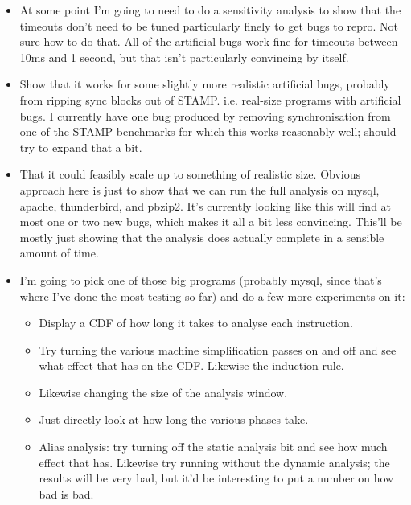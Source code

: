 \begin{itemize}
\item At some point I'm going to need to do a sensitivity analysis to
  show that the timeouts don't need to be tuned particularly finely to
  get bugs to repro.  Not sure how to do that.  All of the artificial
  bugs work fine for timeouts between 10ms and 1 second, but that
  isn't particularly convincing by itself.
\item Show that it works for some slightly more realistic artificial
  bugs, probably from ripping sync blocks out of STAMP.
  i.e. real-size programs with artificial bugs.  I currently have one
  bug produced by removing synchronisation from one of the STAMP
  benchmarks for which this works reasonably well; should try to
  expand that a bit.

\item That it could feasibly scale up to something of realistic size.
  Obvious approach here is just to show that we can run the full
  analysis on mysql, apache, thunderbird, and pbzip2.  It's currently
  looking like this will find at most one or two new bugs, which makes
  it all a bit less convincing.  This'll be mostly just showing that
  the analysis does actually complete in a sensible amount of time.
\item I'm going to pick one of those big programs (probably mysql,
  since that's where I've done the most testing so far) and do a few
  more experiments on it:

  \begin{itemize}
  \item Display a CDF of how long it takes to analyse each instruction.
  \item Try turning the various machine simplification passes on and
    off and see what effect that has on the CDF.  Likewise the
    induction rule.
  \item Likewise changing the size of the analysis window.
  \item Just directly look at how long the various phases take.
  \item Alias analysis: try turning off the static analysis bit and
    see how much effect that has.  Likewise try running without the
    dynamic analysis; the results will be very bad, but it'd be
    interesting to put a number on how bad is bad.
  \end{itemize}


\end{itemize}
